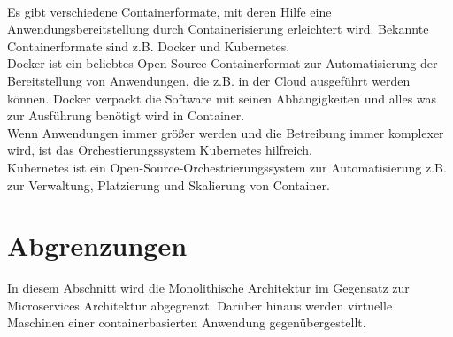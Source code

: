 \\                                                                                   Es gibt verschiedene Containerformate, mit deren Hilfe eine Anwendungsbereitstellung durch Containerisierung erleichtert wird. Bekannte Containerformate sind z.B. Docker und Kubernetes.\\
Docker ist ein beliebtes Open-Source-Containerformat zur Automatisierung der Bereitstellung von Anwendungen, die z.B. in der Cloud ausgeführt werden können. Docker verpackt die Software mit seinen Abhängigkeiten und alles was zur Ausführung benötigt wird in Container.\\
Wenn Anwendungen immer größer werden und die Betreibung immer komplexer wird, ist das Orchestierungssystem Kubernetes hilfreich.\\
Kubernetes ist ein Open-Source-Orchestrierungssystem zur Automatisierung z.B. zur Verwaltung, Platzierung und Skalierung von Container.\cite{kubernetes}
                   
\section{Abgrenzungen}
In diesem Abschnitt wird die Monolithische Architektur im Gegensatz zur Microservices Architektur abgegrenzt. Darüber hinaus werden virtuelle Maschinen einer containerbasierten Anwendung gegenübergestellt.

